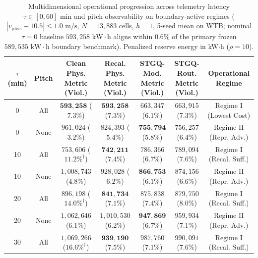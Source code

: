 \documentclass[
  journal]{IEEEtran}
\begin{document}
\begin{table}[!t]
\centering
\fontsize{8.0pt}{9.2pt}\selectfont
\setlength{\tabcolsep}{4.0pt}
\renewcommand{\arraystretch}{0.90}
\caption{Multidimensional operational progression across telemetry latency $\tau \in [0, 60]\text{ min}$ and pitch observability on boundary-active regimes ($|v_{\text{phys}}-10.5|\le 1.0\text{ m/s}$, $N=13{,}883$ cells, $h=1$, 5-seed mean on WTB; nominal $\tau=0$ baseline $593{,}258\text{ kW}\cdot\text{h}$ aligns within $0.6\%$ of the primary frozen $589{,}535\text{ kW}\cdot\text{h}$ boundary benchmark). Penalized reserve energy in kW$\cdot$h ($\rho=10$).}
\label{tab:phase-scan}
\begin{tabular*}{\textwidth}{@{\extracolsep{\fill}}ccccccc@{}}
\toprule
$\tau$ (min) & Pitch & \shortstack{Clean Phys.\\Metric (Viol.)} & \shortstack{Recal. Phys.\\Metric (Viol.)} & \shortstack{STGQ-Mod.\\Metric (Viol.)} & \shortstack{STGQ-Rout.\\Metric (Viol.)} & \shortstack{Operational\\Regime} \\
\midrule
0 & All & $\mathbf{593{,}258}$ ($7.3\%$) & $\mathbf{593{,}258}$ ($7.3\%$) & $663{,}347$ ($6.1\%$) & $663{,}915$ ($7.3\%$) & Regime I (Lowest Cost) \\
0 & None & $961{,}024$ ($3.2\%$) & $824{,}393$ ($5.4\%$) & $\mathbf{755{,}794}$ ($5.8\%$) & $756{,}257$ ($6.4\%$) & Regime II (Repr. Adv.) \\
\midrule
10 & All & $753{,}606$ ($11.2\%^{\dagger}$) & $\mathbf{742{,}211}$ ($7.4\%$) & $786{,}366$ ($6.7\%$) & $789{,}094$ ($7.6\%$) & Regime I (Recal. Suff.) \\
10 & None & $1{,}008{,}743$ ($4.8\%$) & $928{,}028$ ($6.2\%$) & $\mathbf{866{,}753}$ ($6.1\%$) & $874{,}156$ ($6.6\%$) & Regime II (Repr. Adv.) \\
\midrule
20 & All & $896{,}198$ ($14.0\%^{\dagger}$) & $\mathbf{841{,}734}$ ($7.1\%$) & $875{,}838$ ($7.4\%$) & $879{,}750$ ($8.0\%$) & Regime I (Recal. Suff.) \\
20 & None & $1{,}062{,}646$ ($6.1\%$) & $1{,}010{,}530$ ($6.2\%$) & $\mathbf{947{,}869}$ ($6.7\%$) & $959{,}934$ ($7.1\%$) & Regime II (Repr. Adv.) \\
\midrule
30 & All & $1{,}069{,}266$ ($16.6\%^{\dagger}$) & $\mathbf{939{,}190}$ ($7.5\%$) & $987{,}760$ ($7.1\%$) & $990{,}091$ ($7.6\%$) & Regime I (Recal. Suff.) \\

\end{tabular*}
\end{table}
\end{document}
